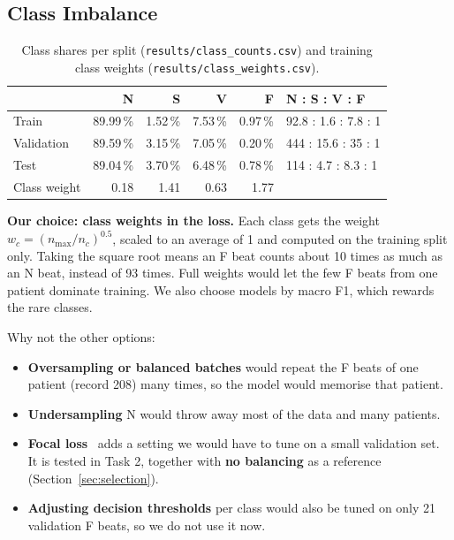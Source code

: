 \documentclass[11pt,a4paper]{article}
\newcommand{\code}[1]{\texttt{#1}}
\begin{document}
\subsection{Class Imbalance}
\label{sec:imbalance}

\begin{table}[H]
\centering
\small
\caption{Class shares per split (\code{results/class\_counts.csv}) and training class weights (\code{results/class\_weights.csv}).}
\label{tab:imbalance}
\begin{tabular}{@{} l r r r r l @{}}
\toprule
 & N & S & V & F & N : S : V : F \\
\midrule
Train & 89.99\,\% & 1.52\,\% & 7.53\,\% & 0.97\,\% & 92.8 : 1.6 : 7.8 : 1 \\
Validation & 89.59\,\% & 3.15\,\% & 7.05\,\% & 0.20\,\% & 444 : 15.6 : 35 : 1 \\
Test & 89.04\,\% & 3.70\,\% & 6.48\,\% & 0.78\,\% & 114 : 4.7 : 8.3 : 1 \\
\midrule
Class weight & 0.18 & 1.41 & 0.63 & 1.77 & \\
\bottomrule
\end{tabular}
\end{table}

\textbf{Our choice: class weights in the loss.} Each class gets the weight $w_c = (n_{\max}/n_c)^{0.5}$, scaled to an average of 1 and computed on the training split only. Taking the square root means an F beat counts about 10 times as much as an N beat, instead of 93 times. Full weights would let the few F beats from one patient dominate training. We also choose models by macro F1, which rewards the rare classes.

Why not the other options:
\begin{itemize}
  \item \textbf{Oversampling or balanced batches} would repeat the F beats of one patient (record 208) many times, so the model would memorise that patient.
  \item \textbf{Undersampling} N would throw away most of the data and many patients.
  \item \textbf{Focal loss}~\citep{lin2017focal} adds a setting we would have to tune on a small validation set. It is tested in Task 2, together with \textbf{no balancing} as a reference (Section~\ref{sec:selection}).
  \item \textbf{Adjusting decision thresholds} per class would also be tuned on only 21 validation F beats, so we do not use it now.
\end{itemize}
\end{document}
